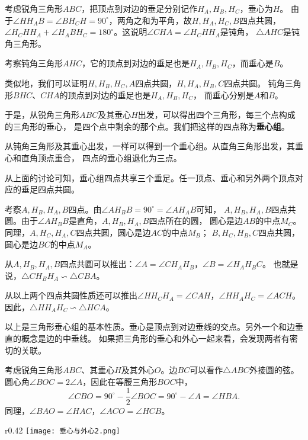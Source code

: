 \documentclass[12pt,UTF8]{ctexbook}
\begin{document}
考虑锐角三角形$ABC$，把顶点到对边的垂足分别记作$H_A, H_B, H_C$，垂心为$H$。
由于$\angle HH_AB = \angle BH_CH = 90^\circ$，两角之和为平角，故$H, H_A, H_C, B$四点共圆，
$\angle H_CHH_A + \angle H_ABH_C = 180^\circ$。这说明$\angle CHA = \angle H_CHH_A$是钝角，
$\triangle AHC$是钝角三角形。

考察钝角三角形$AHC$，它的顶点到对边的垂足也是$H_A, H_B, H_C$，而垂心是$B$。

类似地，我们可以证明$H, H_B, H_C, A$四点共圆，$H, H_A, H_B, C$四点共圆。
钝角三角形$BHC$、$CHA$的顶点到对边的垂足也是$H_A, H_B, H_C$，
而垂心分别是$A$和$B$。

于是，从锐角三角形$ABC$及其垂心$H$出发，可以得出四个三角形，每三个点构成的三角形的垂心，
是四个点中剩余的那个点。我们把这样的四点称为\textbf{垂心组}。

从钝角三角形及其垂心出发，一样可以得到一个垂心组。从直角三角形出发，其垂心和直角顶点重合，
四点的垂心组退化为三点。

从上面的讨论可知，垂心组四点共享三个垂足。任一顶点、垂心和另外两个顶点对应的垂足四点共圆。

考察$A, H_B, H_A, B$四点。由$\angle AH_BB = 90^\circ = \angle AH_AB$可知，
$A, H_B, H_A, B$四点共圆。由于$\angle AH_BB$是直角，$A, H_B, H_A, B$四点所在的圆，
圆心是边$AB$的中点$M_C$。同理，$A, H_C, H_A, C$四点共圆，圆心是边$AC$的中点$M_B$；
$B, H_C, H_B, C$四点共圆，圆心是边$BC$的中点$M_A$。

从$A, H_B, H_A, B$四点共圆可以推出：$\angle A = \angle CH_AH_B$，$\angle B = \angle H_AH_BC$。
也就是说，$\triangle CH_BH_A \backsim \triangle CBA$。

从以上两个四点共圆性质还可以推出$\angle HH_CH_A = \angle CAH$，$\angle HH_AH_C = \angle ACH$。
因此，$\triangle HH_AH_C \backsim \triangle HCA$。

以上是三角形垂心组的基本性质。垂心是顶点到对边垂线的交点。另外一个和边垂直的概念是边的中垂线。
如果把三角形的垂心和外心一起来看，会发现两者有密切的关联。

考虑锐角三角形$ABC$、其垂心$H$及其外心$O$。边$BC$可以看作$\triangle ABC$外接圆的弦。
圆心角$\angle BOC = 2\angle A$，因此在等腰三角形$BOC$中，
$$\angle CBO = 90^\circ - \frac{1}{2}\angle BOC = 90^\circ - \angle A = \angle HBA.$$
同理，$\angle BAO = \angle HAC$，$\angle ACO = \angle HCB$。

\begin{wrapfigure}[9]{r}{0.42\textwidth} %
    \vspace{-50pt}
    \flushright
    \texttt{[image: 垂心与外心2.png]}
\end{wrapfigure}
\end{document}
